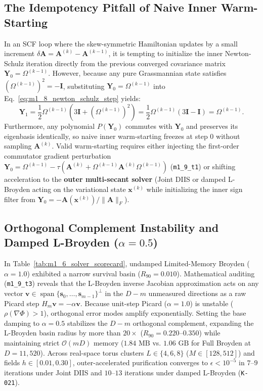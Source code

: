 \subsection{The Idempotency Pitfall of Naive Inner Warm-Starting}
In an SCF loop where the skew-symmetric Hamiltonian updates by a small increment $\delta\mathbf{A} = \mathbf{A}^{(k)} - \mathbf{A}^{(k-1)}$, it is tempting to initialize the inner Newton-Schulz iteration directly from the previous converged covariance matrix $\mathbf{Y}_0 = \Omega^{(k-1)}$. However, because any pure Grassmannian state satisfies $(\Omega^{(k-1)})^2 = -\mathbf{I}$, substituting $\mathbf{Y}_0 = \Omega^{(k-1)}$ into Eq.~\eqref{eq:m1_8_newton_schulz_step} yields:
\begin{equation}
\label{eq:m1_9_warm_start_freeze}
\mathbf{Y}_1 = \frac{1}{2}\Omega^{(k-1)}\left(3\mathbf{I} + (\Omega^{(k-1)})^2\right) = \frac{1}{2}\Omega^{(k-1)}(3\mathbf{I} - \mathbf{I}) = \Omega^{(k-1)}.
\end{equation}
Furthermore, any polynomial $P(\mathbf{Y}_0)$ commutes with $\mathbf{Y}_0$ and preserves its eigenbasis identically, so naive inner warm-starting freezes at step 0 without sampling $\mathbf{A}^{(k)}$. Valid warm-starting requires either injecting the first-order commutator gradient perturbation $\mathbf{Y}_0 = \Omega^{(k-1)} - \tau(\mathbf{A}^{(k)} + \Omega^{(k-1)}\mathbf{A}^{(k)}\Omega^{(k-1)})$ (\texttt{m1\_9\_t1}) or shifting acceleration to the \textbf{outer multi-secant solver} (Joint DIIS or damped L-Broyden acting on the variational state $\mathbf{x}^{(k)}$ while initializing the inner sign filter from $\mathbf{Y}_0 = -\mathbf{A}(\mathbf{x}^{(k)})/\|\mathbf{A}\|_F$).

\subsection{Orthogonal Complement Instability and Damped L-Broyden ($\alpha = 0.5$)}
In Table~\ref{tab:m1_6_solver_scorecard}, undamped Limited-Memory Broyden ($\alpha = 1.0$) exhibited a narrow survival basin ($R_{90} = 0.010$). Mathematical auditing (\texttt{m1\_9\_t3}) reveals that the L-Broyden inverse Jacobian approximation acts on any vector $\mathbf{v} \in \operatorname{span}\{\mathbf{s}_0, \dots, \mathbf{s}_{m-1}\}^\perp$ in the $D - m$ unmeasured directions as a raw Picard step $H_m \mathbf{v} = -\alpha \mathbf{v}$. Because unit-step Picard ($\alpha = 1.0$) is unstable ($\rho(\nabla\Phi) > 1$), orthogonal error modes amplify exponentially. Setting the base damping to $\alpha = 0.5$ stabilizes the $D - m$ orthogonal complement, expanding the L-Broyden basin radius by more than $20\times$ ($R_{90} = 0.220\text{--}0.350$) while maintaining strict $\mathcal{O}(mD)$ memory ($1.84\text{ MB}$ vs. $1.06\text{ GB}$ for Full Broyden at $D = 11{,}520$). Across real-space torus clusters $L \in \{4, 6, 8\}$ ($M \in [128, 512]$) and fields $h \in [0.01, 0.30]$, outer-accelerated purification converges to $\epsilon < 10^{-5}$ in $7\text{--}9$ iterations under Joint DIIS and $10\text{--}13$ iterations under damped L-Broyden (\texttt{K-021}).

